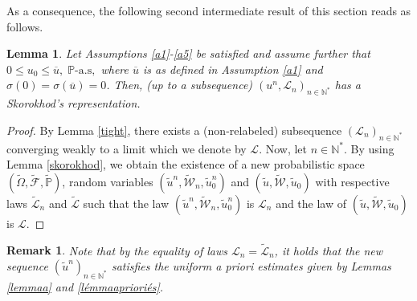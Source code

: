 \documentclass[10pt,number,preprint,times]{elsarticle}
\numberwithin{equation}{section} %
\newtheorem{lem}{Lemma}[section]
\newtheorem{rem}{Remark}[section]
\begin{document}
As a consequence, the following second intermediate result of this section reads as follows.
\begin{lem}
	Let Assumptions \ref{a1}-\ref{a5} be satisfied and assume further that $0 \leq u_0 \leq \overline{u},\; \mathbb{P}\text{-a.s},$ where $\overline{u}$ is as defined in Assumption \ref{a1} and $\sigma(0)=\sigma(\overline{u})=0$. Then, (up to a subsequence)  $\left(u^n,\mathscr{L}_n\right)_{n \in \mathbb{N}^*}$ has a Skorokhod's representation.
\end{lem}
\begin{proof}
	By Lemma \ref{tight}, there exists a (non-relabeled) subsequence $\left(\mathscr{L}_n\right)_{n \in \mathbb{N}^*}$ converging weakly to a limit which we denote by $\mathscr{L}$. Now, let $n \in \mathbb{N}^*$. By using Lemma \ref{skorokhod}, we obtain the existence of a new probabilistic space $\left(\tilde{\Omega},\tilde{\mathcal{F}},\tilde{\mathbb{P}}\right)$, random variables $\left(\tilde{u}^n,\tilde{\mathcal{W}}_n,\tilde{u}_0^n\right)$ and  $\left(\tilde{u},\tilde{\mathcal{W}},\tilde{u}_0\right)$ with respective laws $\tilde{\mathscr{L}}_n$ and $\tilde{\mathscr{L}}$ such that the law $\left(\tilde{u}^n,\tilde{\mathcal{W}}_n,\tilde{u}_0^n\right)$ is $\mathscr{L}_n$ and the law of $\left(\tilde{u},\tilde{\mathcal{W}},\tilde{u}_0\right)$ is $\mathscr{L}$.
%
\end{proof}
\begin{rem}
	Note that by the equality of laws $\mathscr{L}_n=\tilde{\mathscr{L}}_n$, it holds that the new sequence $\left(\tilde{u}^n\right)_{n \in \mathbb{N}^*}$ satisfies the uniform a priori estimates given by Lemmas \ref{lemmaa} and \ref{lémmaaprioriés}.
\end{rem}
\end{document}
